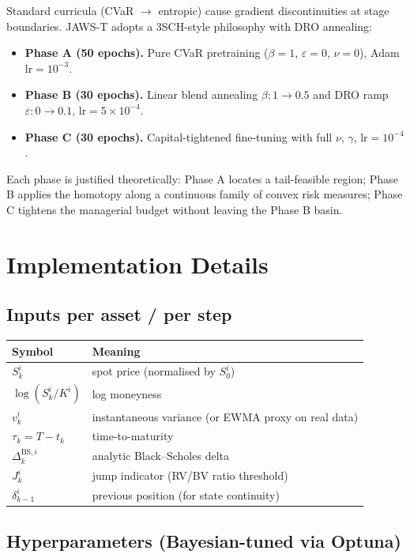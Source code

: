 \documentclass[11pt,a4paper]{article}
\begin{document}
Standard curricula (CVaR $\to$ entropic) cause gradient discontinuities at
stage boundaries. JAWS-T adopts a 3SCH-style philosophy with DRO annealing:
\begin{itemize}[leftmargin=*]
  \item \textbf{Phase A (50 epochs).} Pure CVaR pretraining ($\beta=1$,
    $\varepsilon=0$, $\nu=0$), Adam $\mathrm{lr}=10^{-3}$.
  \item \textbf{Phase B (30 epochs).} Linear blend annealing
    $\beta : 1 \to 0.5$ and DRO ramp $\varepsilon : 0 \to 0.1$,
    $\mathrm{lr}=5\times 10^{-4}$.
  \item \textbf{Phase C (30 epochs).} Capital-tightened fine-tuning with full
    $\nu$, $\gamma$, $\mathrm{lr}=10^{-4}$.
\end{itemize}
Each phase is justified theoretically: Phase A locates a tail-feasible
region; Phase B applies the homotopy along a continuous family of convex
risk measures; Phase C tightens the managerial budget without leaving the
Phase B basin.

\section{Implementation Details}

\subsection{Inputs per asset / per step}

\begin{center}
\begin{tabular}{@{}ll@{}}
\toprule
Symbol & Meaning \\
\midrule
$S_k^i$ & spot price (normalised by $S_0^i$) \\
$\log(S_k^i / K^i)$ & log moneyness \\
$v_k^i$ & instantaneous variance (or EWMA proxy on real data) \\
$\tau_k = T - t_k$ & time-to-maturity \\
$\Delta^{\mathrm{BS},i}_k$ & analytic Black--Scholes delta \\
$J_k^i$ & jump indicator (RV/BV ratio threshold) \\
$\delta_{k-1}^i$ & previous position (for state continuity) \\
\bottomrule
\end{tabular}
\end{center}

\subsection{Hyperparameters (Bayesian-tuned via Optuna)}
\end{document}
